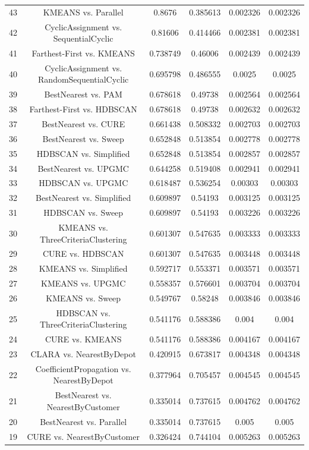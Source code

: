 \documentclass[a4paper,10pt]{article}
\begin{document}
\begin{landscape}
\begin{table}[!htp]
\begin{tabular}{cccccc}
43&KMEANS vs. Parallel&0.8676&0.385613&0.002326&0.002326\\
42&CyclicAssignment vs. SequentialCyclic&0.81606&0.414466&0.002381&0.002381\\
41&Farthest-First vs. KMEANS&0.738749&0.46006&0.002439&0.002439\\
40&CyclicAssignment vs. RandomSequentialCyclic&0.695798&0.486555&0.0025&0.0025\\
39&BestNearest vs. PAM&0.678618&0.49738&0.002564&0.002564\\
38&Farthest-First vs. HDBSCAN&0.678618&0.49738&0.002632&0.002632\\
37&BestNearest vs. CURE&0.661438&0.508332&0.002703&0.002703\\
36&BestNearest vs. Sweep&0.652848&0.513854&0.002778&0.002778\\
35&HDBSCAN vs. Simplified&0.652848&0.513854&0.002857&0.002857\\
34&BestNearest vs. UPGMC&0.644258&0.519408&0.002941&0.002941\\
33&HDBSCAN vs. UPGMC&0.618487&0.536254&0.00303&0.00303\\
32&BestNearest vs. Simplified&0.609897&0.54193&0.003125&0.003125\\
31&HDBSCAN vs. Sweep&0.609897&0.54193&0.003226&0.003226\\
30&KMEANS vs. ThreeCriteriaClustering&0.601307&0.547635&0.003333&0.003333\\
29&CURE vs. HDBSCAN&0.601307&0.547635&0.003448&0.003448\\
28&KMEANS vs. Simplified&0.592717&0.553371&0.003571&0.003571\\
27&KMEANS vs. UPGMC&0.558357&0.576601&0.003704&0.003704\\
26&KMEANS vs. Sweep&0.549767&0.58248&0.003846&0.003846\\
25&HDBSCAN vs. ThreeCriteriaClustering&0.541176&0.588386&0.004&0.004\\
24&CURE vs. KMEANS&0.541176&0.588386&0.004167&0.004167\\
23&CLARA vs. NearestByDepot&0.420915&0.673817&0.004348&0.004348\\
22&CoefficientPropagation vs. NearestByDepot&0.377964&0.705457&0.004545&0.004545\\
21&BestNearest vs. NearestByCustomer&0.335014&0.737615&0.004762&0.004762\\
20&BestNearest vs. Parallel&0.335014&0.737615&0.005&0.005\\
19&CURE vs. NearestByCustomer&0.326424&0.744104&0.005263&0.005263\\

\end{tabular}
\end{table}
\end{landscape}
\end{document}
